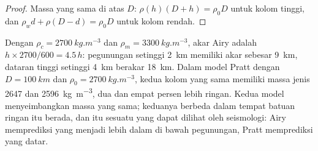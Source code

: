 \begin{proof}
Massa yang sama di atas $D$: $\rho(h)(D + h) = \rho_0 D$ untuk kolom tinggi, dan
$\rho_w d + \rho(D - d) = \rho_0 D$ untuk kolom rendah.
\end{proof}

Dengan $\rho_c = \qty{2700}{kg.m^{-3}}$ dan $\rho_m = \qty{3300}{kg.m^{-3}}$, akar Airy adalah $h\times2700/600 = 4.5\,h$: pegunungan setinggi \qty{2}{km} memiliki akar sebesar \qty{9}{km}, dataran tinggi setinggi \qty{4}{km} berakar \qty{18}{km}. Dalam model Pratt dengan $D = \qty{100}{km}$ dan $\rho_0 = \qty{2700}{kg.m^{-3}}$, kedua kolom yang sama memiliki massa jenis 2647 dan \qty{2596}{kg.m^{-3}}, dua dan empat persen lebih ringan. Kedua model menyeimbangkan massa yang sama; keduanya berbeda dalam tempat batuan ringan itu berada, dan itu sesuatu yang dapat dilihat oleh seismologi: Airy memprediksi  yang menjadi lebih dalam di bawah pegunungan, Pratt memprediksi  yang datar.

